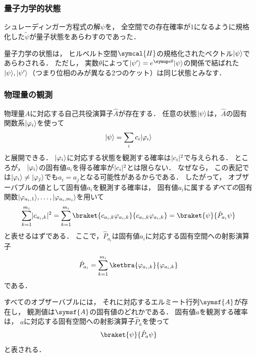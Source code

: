 \documentclass[
]{sotsu}
\begin{document}
\subsubsection{量子力学的状態}

シュレーディンガー方程式の解$\psi$を，
全空間での存在確率が$1$になるように規格化した$\tilde{\psi}$が量子状態をあらわすのであった．

\begin{qmaxiom}[状態は規格化されたベクトルとしてあらわされる]
    量子力学の状態は，
    ヒルベルト空間$\symcal{H}$の規格化されたベクトル$\lvert\psi\rangle$であらわされる．
    ただし，
    実数$\theta$によって$\ket{\psi'} = e^{\iu \theta} \ket{\psi}$の関係で結ばれた$\lvert\psi\rangle, \lvert\psi'\rangle$（つまり位相のみが異なる2つのケット）は同じ状態とみなす．    
\end{qmaxiom}


\subsubsection{物理量の観測}

物理量$A$に対応する自己共役演算子$\hat{A}$が存在する．
任意の状態$\lvert\psi\rangle$は，$\hat{A}$の固有関数系$\lvert\varphi_i\rangle$を使って
\begin{equation*}
    \lvert\psi\rangle = \sum_i c_i \lvert\varphi_i\rangle
\end{equation*}
と展開できる．
$\lvert\varphi_i\rangle$に対応する状態を観測する確率は$\lvert c_i\rvert^2$で与えられる．
ところが，
$\lvert\varphi_i\rangle$の固有値$a_i$を得る確率が$\lvert c_i\rvert^2$とは限らない．
なぜなら，
この表記では$\lvert\varphi_i\rangle \neq \lvert\varphi_j\rangle$でも$a_i = a_j$となる可能性があるからである．
したがって，
オブザーバブルの値として固有値$a_i$を観測する確率は，
固有値$a_i$に属する\emph{すべての}固有関数$\lvert\varphi_{a_i, 1}\rangle, \dots, \lvert\varphi_{a_i, m_i}\rangle$を用いて
\begin{equation*}
    \sum_{k = 1}^{m_i} \abs{c_{a_i, k}}^2
    = \sum_{k = 1}^{m_i} \braket{c_{a_i, k} \varphi_{a_i, k}}{c_{a_i, k} \varphi_{a_i, k}}
    = \braket{\psi}{\hat{P}_{a_i} \psi}
\end{equation*}
と表せるはずである．
ここで，$\hat{P}_{a_i}$は固有値$a_i$に対応する固有空間への射影演算子
\begin{equation*}
    \hat{P}_{a_i} = \sum_{k = 1}^{m_i} \ketbra{\varphi_{a_i, k}}{\varphi_{a_i, k}}
\end{equation*}
である．

\begin{qmaxiom}
    すべてのオブザーバブルには，
    それに対応するエルミート行列$\symsf{A}$が存在し，
    観測値は$\symsf{A}$の固有値のどれかである．
    固有値$a$を観測する確率は，
    $a$に対応する固有空間への射影演算子$\hat{P}_a$を使って
    \begin{equation}
        \braket{\psi}{\hat{P}_a \psi}
    \end{equation}
    と表される．
\end{qmaxiom}
\end{document}
